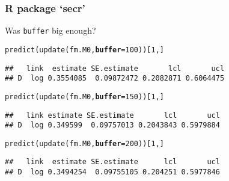 \documentclass[color=usenames,dvipsnames]{beamer}\usepackage[]{graphicx}\usepackage[]{xcolor}
\makeatletter
\newcommand{\hlnum}[1]{\textcolor[rgb]{0.69,0.494,0}{#1}}%
\newcommand{\hldef}[1]{\textcolor[rgb]{0,0,0}{#1}}%
\newcommand{\hlkwc}[1]{\textcolor[rgb]{0,0,0}{\textbf{#1}}}%
\newcommand{\hlkwd}[1]{\textcolor[rgb]{0.004,0.004,0.506}{#1}}%
\newenvironment{kframe}{%
 \def\at@end@of@kframe{}%
 \ifinner\ifhmode%
  \def\at@end@of@kframe{\end{minipage}}%
  \begin{minipage}{\columnwidth}%
 \fi\fi%
 \def\FrameCommand##1{\hskip\@totalleftmargin \hskip-\fboxsep
 \colorbox{shadecolor}{##1}\hskip-\fboxsep
     \hskip-\linewidth \hskip-\@totalleftmargin \hskip\columnwidth}%
 \MakeFramed {\advance\hsize-\width
   \@totalleftmargin\z@ \linewidth\hsize
   \@setminipage}}%
 {\par\unskip\endMakeFramed%
 \at@end@of@kframe}
\newenvironment{knitrout}{}{} %
\newcommand{\inr}[1]{\colorbox{inlinecolor}{\texttt{#1}}}
\makeatother
\begin{document}
\begin{frame}[fragile]
  \frametitle{R package `secr'}
  \small
  Was \inr{buffer} big enough?
\begin{knitrout}\scriptsize
{}\color{fgcolor}\begin{kframe}
\begin{alltt}
\hlkwd{predict}\hldef{(}\hlkwd{update}\hldef{(fm.M0,} \hlkwc{buffer}\hldef{=}\hlnum{100}\hldef{))[}\hlnum{1}\hldef{,]}
\end{alltt}
\begin{verbatim}
##   link  estimate SE.estimate       lcl       ucl
## D  log 0.3554085  0.09872472 0.2082871 0.6064475
\end{verbatim}
\end{kframe}
\end{knitrout}
\pause
\vspace{-12pt}
\begin{knitrout}\scriptsize
{}\color{fgcolor}\begin{kframe}
\begin{alltt}
\hlkwd{predict}\hldef{(}\hlkwd{update}\hldef{(fm.M0,} \hlkwc{buffer}\hldef{=}\hlnum{150}\hldef{))[}\hlnum{1}\hldef{,]}
\end{alltt}
\begin{verbatim}
##   link estimate SE.estimate       lcl       ucl
## D  log 0.349599  0.09757013 0.2043843 0.5979884
\end{verbatim}
\end{kframe}
\end{knitrout}
\pause
\vspace{-12pt}
\begin{knitrout}\scriptsize
{}\color{fgcolor}\begin{kframe}
\begin{alltt}
\hlkwd{predict}\hldef{(}\hlkwd{update}\hldef{(fm.M0,} \hlkwc{buffer}\hldef{=}\hlnum{200}\hldef{))[}\hlnum{1}\hldef{,]}
\end{alltt}
\begin{verbatim}
##   link  estimate SE.estimate      lcl       ucl
## D  log 0.3494254  0.09755105 0.204251 0.5977846
\end{verbatim}
\end{kframe}
\end{knitrout}
\pause
\vspace{-12pt}
\begin{knitrout}\scriptsize
{}\color{fgcolor}\begin{kframe}

\end{kframe}
\end{knitrout}
\end{frame}
\end{document}
